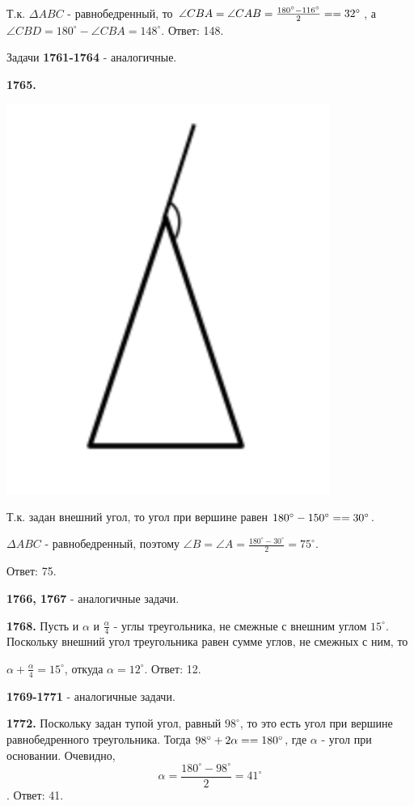 Т.к. $\Delta ABC$ - равнобедренный, то $\angle CBA = \angle CAB = \frac{180^\circ - 116^\circ}{2} = \linebreak =32^\circ$, а $\angle CBD = 180^\circ - \angle CBA = 148^\circ.$ \newline \null \hspace*{\fill} Ответ: 148.

Задачи \textbf{1761-1764} - аналогичные.

\textbf{1765.}

{\centering \includegraphics[width=0.3\linewidth]{Geometry/Content/6.png}

}

Т.к. задан внешний угол, то угол при вершине равен $180^\circ - 150^\circ = \linebreak
=30^\circ$.

$\Delta ABC$ - равнобедренный, поэтому $\angle B = \angle A = \frac{180^\circ - 30^\circ}{2} = 75^\circ$.

\null \hspace*{\fill} Ответ: 75.

\textbf{1766, 1767} - аналогичные задачи.

\textbf{1768.} Пусть и $\alpha$ и $\frac{\alpha}{4}$ - углы треугольника, не смежные с внешним углом $15^\circ$. Поскольку внешний угол треугольника равен сумме углов, не смежных с ним, то

{\centering $\alpha + \frac{\alpha}{4} = 15^\circ$, откуда $\alpha =12^\circ$. \newline \null \hspace*{\fill} Ответ: 12.

}

\textbf{1769-1771} - аналогичные задачи.

\textbf{1772.}  Поскольку задан тупой угол, равный $98^\circ$, то это есть угол при вершине равнобедренного треугольника. Тогда  $98^\circ + 2\alpha = \linebreak= 180^\circ$, где $\alpha$ - угол при основании. Очевидно, 
\[
\alpha = \frac{180^\circ - 98^\circ}{2} = 41^\circ
\].\null \hspace*{\fill} Ответ: 41.

